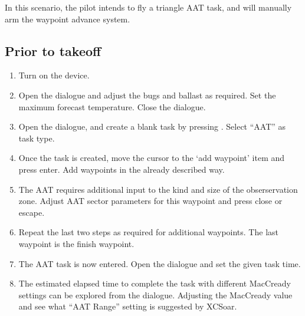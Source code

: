 In this scenario, the pilot intends to fly a triangle AAT task, and
will manually arm the waypoint advance system.

\subsection*{Prior to takeoff}
\begin{enumerate}
\item  Turn on the device.
\item  Open the  dialogue and adjust the bugs and ballast as
  required. Set the maximum forecast temperature.  Close the dialogue.
\item Open the  dialogue, and create a blank task by pressing
. Select ``AAT'' as task type.
\item  Once the task is created, move the cursor to the `add waypoint' item
  and press enter.  Add waypoints in the already described way. 
\item  The AAT requires additional input to the kind and size of the
  obserservation zone. Adjust AAT sector parameters for this waypoint and press
  close or escape.
\item  Repeat the last two steps as required for additional waypoints.  The last
  waypoint is the finish waypoint.
\item  The AAT task is now entered.  Open the  dialogue
  and set the given task time. 
\item  The estimated elapsed time to complete the task with different MacCready
  settings can be explored from the  dialogue.  Adjusting the 
  MacCready value and see what ``AAT Range'' setting is suggested by XCSoar.
\end{enumerate}

